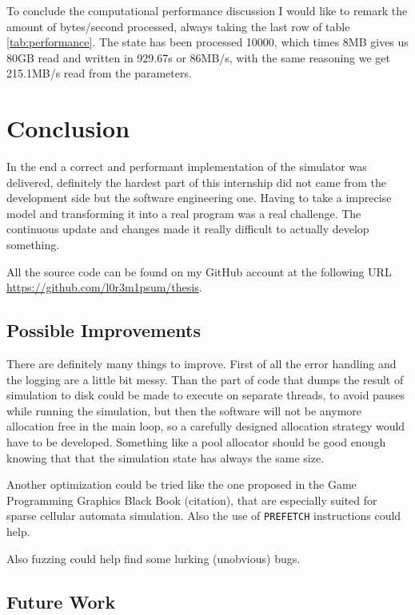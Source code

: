 \documentclass[Lau]{sapthesis} %
\let\oldsection\section
\def\subsection{\oldsection}
\def\section{\chapter}
\begin{document}
To conclude the computational performance discussion I would like to remark the
amount of bytes/second processed, always taking the last row of table
\ref{tab:performance}. The state has been processed 10000, which times 8MB gives
us 80GB read and written in 929.67s or 86MB/s, with the same reasoning we get
215.1MB/s read from the parameters.


\section{Conclusion}

In the end a correct and performant implementation of the simulator was
delivered, definitely the hardest part of this internship did not came from the
development side but the software engineering one. Having to take a imprecise
model and transforming it into a real program was a real challenge. The
continuous update and changes made it really difficult to actually develop
something.

All the source code can be found on my GitHub account at the following URL
\url{https://github.com/l0r3m1psum/thesis}.

\subsection{Possible Improvements}

There are definitely many things to improve. First of all the error handling and
the logging are a little bit messy. Than the part of code that dumps the result
of simulation to disk could be made to execute on separate threads, to avoid
pauses while running the simulation, but then the software will not be anymore
allocation free in the main loop, so a carefully designed allocation strategy
would have to be developed. Something like a pool allocator should be good
enough knowing that that the simulation state has always the same size.

Another optimization could be tried like the one proposed in the Game
Programming Graphics Black Book (citation), that are especially suited for
sparse cellular automata simulation. Also the use of \texttt{PREFETCH}
instructions could help.

Also fuzzing could help find some lurking (unobvious) bugs.

\subsection{Future Work}
\end{document}

